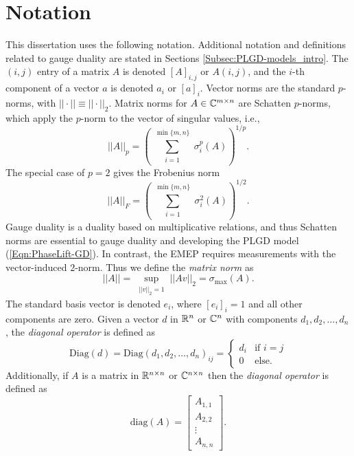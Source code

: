 \section{Notation} 		\label{Subsec:intro-notation}


This dissertation uses the following notation.  Additional notation and definitions related to gauge duality are stated in Sections \ref{Subsec:PLGD-models_intro}.  The $(i,j)$ entry of a matrix $A$ is denoted $[A]_{i,j}$ or $A(i,j)$, and the $i$-th component of a vector $a$ is denoted $a_i$ or $[a]_i$.  Vector norms are the standard $p$-norms, with $||\cdot|| \equiv || \cdot ||_2$.   Matrix norms for $A \in {\mathbb C}^{m \times n}$ are Schatten $p$-norms, which apply the  $p$-norm to the vector of singular values, i.e.,
\begin{equation}  \label{Def:shatten_norms}
||A||_p  = \left( \sum_{\substack{i = 1}}^{\substack{\min\{m, n \}}} \sigma_i^p(A) \right)^{1/p}.
\end{equation}
The special case of $p = 2$ gives the Frobenius norm
\begin{equation} 	\label{Def:Frobenius_norm}
||A||_F = \left(   \sum_{\substack{i = 1}}^{\substack{\min\{m, n \}}} \sigma_i^2(A)  \right)^{1/2}.
\end{equation}
Gauge duality is a duality based on multiplicative relations, and thus Schatten norms are essential to gauge duality and developing the PLGD model (\ref{Eqn:PhaseLift-GD}).  In contrast, the EMEP requires measurements with the vector-induced $2$-norm.  Thus we define the \textit{matrix norm} as
\begin{equation} 		\label{Def:matrix_norm}
||A|| = \sup_{\substack{||v||_2 = 1}} ||Av||_2 = \sigma_{\max}(A).
\end{equation}
The standard basis vector is denoted $e_i$, where $[e_i]_i = 1$ and all other components are zero.  
Given a vector $d$ in ${\mathbb R}^n$ or ${\mathbb C}^n$ with components $d_1, d_2, \ldots, d_n$, the \textit{diagonal operator} is defined as
\begin{equation}
\text{Diag}(d) = \text{Diag}(d_1, d_2, \ldots, d_n)_{ij} = 
	\begin{cases}
		d_i 		&		\text{if } i = j	\\
		0		&	\text{else}.
	\end{cases}
\end{equation}
Additionally, if $A$ is a matrix in ${\mathbb R}^{n \times n}$ or ${\mathbb C}^{n \times n}$ then the \textit{diagonal operator} is defined as
\begin{equation}
\text{diag}(A) = 
	\begin{bmatrix}
		A_{1,1}	\\
		A_{2,2}	\\
		\vdots	\\
		A_{n,n}
	\end{bmatrix}.
\end{equation}

